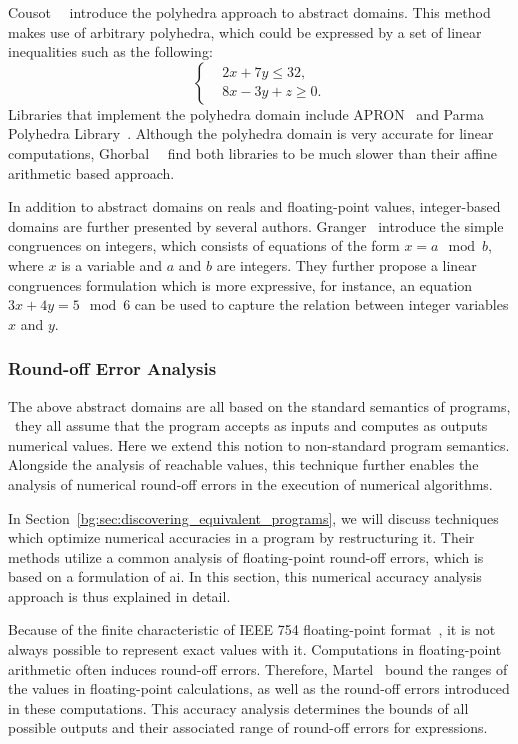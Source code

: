 Cousot~\etal~\cite{cousot78} introduce the polyhedra approach to abstract
domains.  This method makes use of arbitrary polyhedra, which could be
expressed by a set of linear inequalities such as the following:
\begin{equation}
    \left\{
    \begin{aligned}
        & 2x + 7y \leq 32, \\
        & 8x - 3y + z \geq 0.
    \end{aligned}
    \right.
\end{equation}
Libraries that implement the polyhedra domain include APRON~\cite{apron} and
Parma Polyhedra Library~\cite{ppl}.  Although the polyhedra domain is very
accurate for linear computations, Ghorbal~\etal~\cite{ghorbal09} find both
libraries to be much slower than their affine arithmetic based approach.

In addition to abstract domains on reals and floating-point values,
integer-based domains are further presented by several authors.
Granger~\cite{granger89} introduce the simple congruences on integers, which
consists of equations of the form $x = a \mod b$, where $x$ is a variable
and $a$ and $b$ are integers.  They further propose a linear congruences
formulation which is more expressive, for instance, an equation $3 x + 4 y = 5
\mod 6$ can be used to capture the relation between integer variables $x$ and
$y$.

\subsubsection{Round-off Error Analysis}
\label{bg:ssub:accuracy}

The above abstract domains are all based on the standard semantics of programs,
\ie~they all assume that the program accepts as inputs and computes as
outputs numerical values.  Here we extend this notion to non-standard program
semantics.  Alongside the analysis of reachable values, this technique further
enables the analysis of numerical round-off errors in the execution of
numerical algorithms.

In Section~\ref{bg:sec:discovering_equivalent_programs}, we will discuss
techniques which optimize numerical accuracies in a program by restructuring
it.  Their methods utilize a common analysis of floating-point round-off
errors, which is based on a formulation of \gls{ai}\@.  In this section, this
numerical accuracy analysis approach is thus explained in detail.

Because of the finite characteristic of IEEE 754 floating-point
format~\cite{ieee754}, it is not always possible to represent exact values
with it.  Computations in floating-point arithmetic often induces round-off
errors.  Therefore, Martel~\cite{martel07} bound the ranges of the values
in floating-point calculations, as well as the round-off errors introduced
in these computations.  This accuracy analysis determines the bounds of
all possible outputs and their associated range of round-off errors for
expressions.

